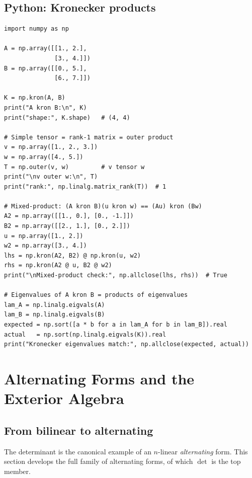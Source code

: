 \documentclass[11pt]{article}
\theoremstyle{definition}
\theoremstyle{plain}
\begin{document}
\subsection{Python: Kronecker products}
\begin{lstlisting}
import numpy as np

A = np.array([[1., 2.],
              [3., 4.]])
B = np.array([[0., 5.],
              [6., 7.]])

K = np.kron(A, B)
print("A kron B:\n", K)
print("shape:", K.shape)   # (4, 4)

# Simple tensor = rank-1 matrix = outer product
v = np.array([1., 2., 3.])
w = np.array([4., 5.])
T = np.outer(v, w)         # v tensor w
print("\nv outer w:\n", T)
print("rank:", np.linalg.matrix_rank(T))  # 1

# Mixed-product: (A kron B)(u kron w) == (Au) kron (Bw)
A2 = np.array([[1., 0.], [0., -1.]])
B2 = np.array([[2., 1.], [0., 2.]])
u = np.array([1., 2.])
w2 = np.array([3., 4.])
lhs = np.kron(A2, B2) @ np.kron(u, w2)
rhs = np.kron(A2 @ u, B2 @ w2)
print("\nMixed-product check:", np.allclose(lhs, rhs))  # True

# Eigenvalues of A kron B = products of eigenvalues
lam_A = np.linalg.eigvals(A)
lam_B = np.linalg.eigvals(B)
expected = np.sort([a * b for a in lam_A for b in lam_B]).real
actual   = np.sort(np.linalg.eigvals(K)).real
print("Kronecker eigenvalues match:", np.allclose(expected, actual))
\end{lstlisting}



\section{Alternating Forms and the Exterior Algebra}

\subsection{From bilinear to alternating}

The determinant is the canonical example of an $n$-linear \emph{alternating}
form.  This section develops the full family of alternating forms, of which
$\det$ is the top member.
\end{document}
